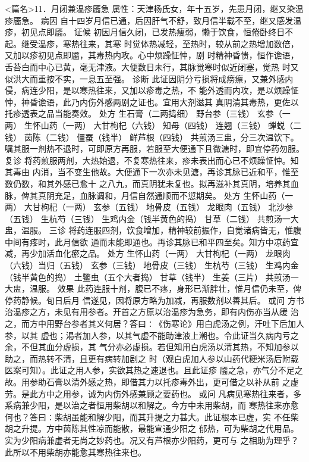 \documentclass[a4paper,12pt,UTF8,twoside]{ctexbook}
\begin{document}
<篇名>11．月闭兼温疹靥急
属性：天津杨氏女，年十五岁，先患月闭，继又染温疹靥急。 
病因 自十四岁月信已通，后因肝气不舒，致月信半载不至，继又感发温疹，初见点即靥。 
证候 初因月信久闭，已发热瘦弱，懒于饮食，恒倦卧终日不起。继受温疹，寒热往来，其寒 
时觉体热减轻，至热时，较从前之热增加数倍，又加以疹初见点即靥，其毒热内攻。心中烦躁怔忡，剧 
时精神昏愦，恒作谵语，舌苔白而中心已黄，毫无津液。大便数日未行，其脉觉寒时似近闭塞，觉热 
时又似洪大而重按不实，一息五至强。 
诊断 此证因阴分亏损将成痨瘵，又兼外感内侵，病连少阳，是以寒热往来，又加以疹毒之热，不 
能外透而内攻，是以烦躁怔忡，神昏谵语，此乃内伤外感两剧之证也。宜用大剂滋其 
真阴清其毒热，更佐以托疹透表之品当能奏效。 
处方 生石膏（二两捣细） 野台参（三钱） 玄参（一两） 生怀山药（一两） 
大甘枸杞（六钱） 知母（四钱） 连翘（三钱） 蝉蜕（二钱） 
茵陈（二钱） 僵蚕（钱半） 鲜芦根（四钱） 
共煎汤三盅，分三次温饮下。嘱其服一剂热不退时，可即原方再服，若服至大便通下且微溏时，即宜停药勿服。 
复诊 将药煎服两剂，大热始退，不复寒热往来，疹未表出而心已不烦躁怔忡。知其毒由 
内消，当不变生他故。大便通下一次亦未见溏，再诊其脉已近和平，惟至数仍数，和其外感已愈十 
之八九，而真阴犹未复也。拟再滋补其真阴，培养其血脉，俾其真阴充足，血脉调和，月信自然通顺而不愆期矣。 
处方 生怀山药（一两） 大甘枸杞（一两） 玄参（五钱） 地骨皮（五钱） 
龙眼肉（五钱） 北沙参（五钱） 生杭芍（三钱） 生鸡内金（钱半黄色的捣） 
甘草（二钱） 
共煎汤一大盅，温服。 
三诊 将药连服四剂，饮食增加，精神较前振作，自觉诸病皆无，惟腹中间有疼时，此月信欲 
通而未能即通也。再诊其脉已和平四至矣。知方中凉药宜减，再少加活血化瘀之品。 
处方 生怀山药（一两） 大甘枸杞（一两） 龙眼肉（六钱）当归（五钱） 
玄参（三钱） 地骨皮（三钱） 生杭芍（三钱） 生鸡内金（钱半黄色的捣） 
土鳖虫（五个大者捣） 甘草（钱半） 生姜（三片） 
共煎汤一大盅，温服。 
效果 此药连服十剂，腹已不疼，身形已渐胖壮，惟月信仍未至，俾停药静候。旬日后月 
信遂见，因将原方略为加减，再服数剂以善其后。 
或问 方书治温疹之方，未见有用参者。开首之方原以治温疹为急务，即有内伤亦当从缓 
治之，而方中用野台参者其义何居？答曰∶《伤寒论》用白虎汤之例，汗吐下后加人参，以其 
虚也；渴者加人参，以其气虚不能助津液上潮也。令此证当久病内亏之余，不但其血分虚损，其 
气分亦必虚损。若但知用白虎汤以清其热，不知加参以助之，而热转不清，且更有病转加剧之 
时（观白虎加人参以山药代粳米汤后附载医案可知）。此证之用人参，实欲其热之速退也。且此证疹 
靥之急，亦气分不足之故。用参助石膏以清外感之热，即借其力以托疹毒外出，更可借之以补从前 
之虚劳。是此方中之用参，诚为内伤外感兼顾之要药也。 
或问 凡病见寒热往来者，多系病兼少阳，是以治之者恒用柴胡以和解之。今方中未用柴胡，而 
寒热往来亦愈何也？答曰∶柴胡虽能和解少阳，而其升提之力甚大。此证根本已虚，实 
不任柴胡之升提。方中茵陈其性凉而能散，最能宣通少阳之 
郁热，可为柴胡之代用品。实为少阳病兼虚者无尚之妙药也。况又有芦根亦少阳药，更可与 
之相助为理乎？此所以不用柴胡亦能愈其寒热往来也。 
\end{document}
